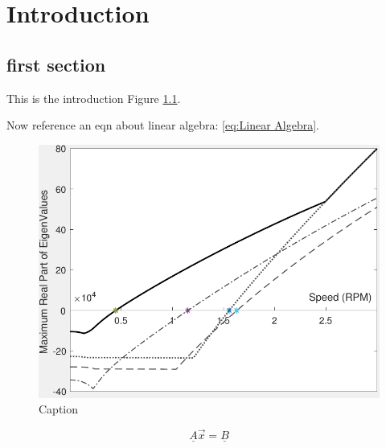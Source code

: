 \chapter{Introduction}
\section{first section}
This is the introduction Figure \ref{fig:my_label}.

Now reference an eqn about linear algebra: \eqref{eq:Linear Algebra}.
\begin{figure}
    \centering
    \includegraphics[width=\linewidth]{figures/StabilityMargin.pdf}
    \caption{Caption}
    \label{fig:my_label}
\end{figure}
\begin{equation} \label{eq:Linear Algebra}
\underline{A}\vec{x}=\underline{B}
\end{equation}

